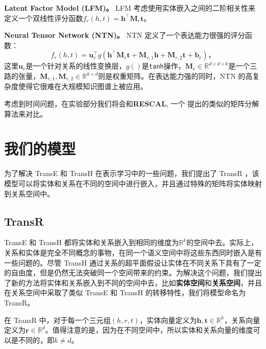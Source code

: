     \textbf{Latent Factor Model (LFM)。} LFM  考虑使用实体嵌入之间的二阶相关性来定义一个双线性评分函数$f_r(h, t) = \mathbf{h}^{\top}\mathbf{M}_r\mathbf{t}$。

    \textbf{Neural Tensor Network (NTN)。} NTN  定义了一个表达能力很强的评分函数：
    \begin{equation}
    f_{r}(h, t) = \mathbf{u}_r^\top g (\mathbf{h}^{\top} \mathbf{M}_r \mathbf{t} + \mathbf{M}_{r, 1} \mathbf{h} + \mathbf{M}_{r, 2}\mathbf{t} + \mathbf{b}_r)，
    \end{equation}
    这里$\mathbf{u}_r$是一个针对关系的线性变换层，$g()$是\texttt{tanh}操作，$\mathbf{M}_r \in \mathbb{R}^{d \times d \times k}$是一个三路的张量，$\mathbf{M}_{r, 1}, \mathbf{M}_{r, 2} \in  \mathbb{R}^{k\times d}$则是权重矩阵。在表达能力强的同时，NTN 的高复杂度使得它很难在大规模知识图谱上被应用。

    考虑到时间问题，在实验部分我们将会和\textbf{RESCAL}, 一个  提出的类似的矩阵分解算法来对比。


    \section{我们的模型}
    \label{sec:method}

    为了解决 TransE 和 TransH 在表示学习中的一些问题，我们提出了 TransR ，该模型可以将实体和关系在不同的空间中进行嵌入，并且通过特殊的矩阵将实体映射到关系空间中。

    \subsection{TransR}


    TransE 和 TransH 都将实体和关系嵌入到相同的维度为$\mathbb{R}^k$的空间中去。实际上，关系和实体是完全不同概念的事物，在同一个语义空间中将这些东西同时嵌入是有一些问题的。尽管 TransH 通过关系的超平面假设让实体在不同关系下具有了一定的自由度，但是仍然无法突破同一个空间带来的约束。为解决这个问题，我们提出了新的方法将实体和关系嵌入到不同的空间中去，比如\textbf{实体空间}和\textbf{关系空间}，并且在关系空间中采取了类似 TransE 和 TransH 的转移特性，我们将模型命名为TransR。

    在 TransR 中，对于每一个三元组$(h, r, t)$，实体向量定义为$\mathbf{h}, \mathbf{t} \in \mathbb{R}^k$，关系向量定义为$\mathbf{r} \in \mathbb{R}^d$。值得注意的是，因为在不同空间中，所以实体和关系向量的维度可以是不同的，即$k \ne d$。

